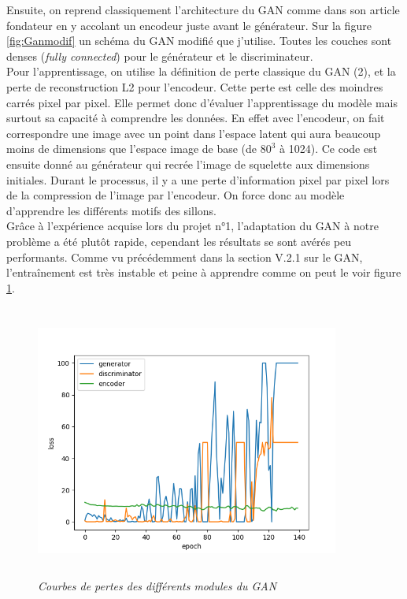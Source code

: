 \documentclass[12pt, oneside, a4paper, titlepage]{article}
\begin{document}
Ensuite, on reprend classiquement l'architecture du GAN comme dans son article fondateur \cite{goodfellow_generative_2014} en y accolant un encodeur juste avant le générateur. Sur la figure \ref{fig:Ganmodif} un schéma du GAN modifié que j'utilise. Toutes les couches sont denses (\textit{fully connected}) pour le générateur et le discriminateur. \\


Pour l'apprentissage, on utilise la définition de perte classique du GAN (2), et la perte de reconstruction L2 pour l'encodeur. Cette perte est celle des moindres carrés pixel par pixel. Elle permet donc d'évaluer l'apprentissage du modèle mais surtout sa capacité à comprendre les données. En effet avec l'encodeur, on fait correspondre une image avec un point dans l'espace latent qui aura beaucoup moins de dimensions que l'espace image de base (de \(80^{3}\) à 1024). Ce code est ensuite donné au générateur qui recrée l'image de squelette aux dimensions initiales. Durant le processus, il y a une perte d'information pixel par pixel lors de la compression de l'image par l'encodeur. On force donc au modèle d'apprendre les différents motifs des sillons.\\

Grâce à l'expérience acquise lors du projet n°1, l'adaptation du GAN à notre problème a été plutôt rapide, cependant les résultats se sont avérés peu performants. Comme vu précédemment dans la section V.2.1 sur le GAN, l'entraînement est très instable et peine à apprendre comme on peut le voir figure \ref{fig:perte_GAN}.

\begin{figure}[H]
    \centering
\includegraphics[width=10cm, height=9cm]{gan3.png}
    \caption{\textit{Courbes de pertes des différents modules du GAN}}
    \label{fig:perte_GAN}
\end{figure}
\end{document}
